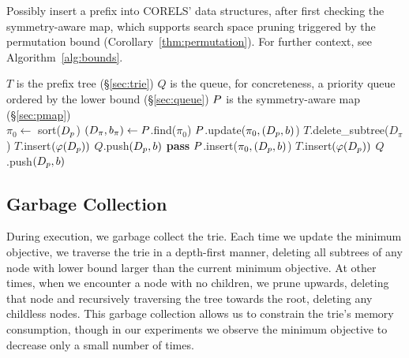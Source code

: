 \begin{algorithm}[t!]
  \caption{Possibly insert a prefix into CORELS' data structures, after first
  checking the symmetry-aware map, which supports search space pruning
  triggered by the permutation bound (Corollary~\ref{thm:permutation}).
  For further context, see Algorithm~\ref{alg:bounds}.}
\label{alg:pmap}
\begin{algorithmic}
\State $T$ is the prefix tree (\S\ref{sec:trie})
\State $Q$ is the queue, for concreteness, a priority queue ordered by the lower bound (\S\ref{sec:queue})
\State $P$ is the symmetry-aware map (\S\ref{sec:pmap}) \\

    \State $\pi_0 \gets$ sort($D_p$) 
    \State $(D_\pi, b_\pi) \gets P$.find($\pi_0$) 
         
            \State $P$.update($\pi_0, (D_p, b)$) 
            \State $T$.delete\_subtree($D_\pi$) 
            \State $T$.insert$(\varphi(D_p))$ 
            \State $Q$.push$(D_p, b)$ 
        \Else
            \State \textbf{pass} 
        \EndIf
    \Else
        \State $P$.insert($\pi_0, (D_p, b)$) 
        \State $T$.insert$(\varphi(D_p))$ 
        \State $Q$.push$(D_p, b)$ 
    \EndIf
\EndFunction
\end{algorithmic}
\end{algorithm}

\subsection{Garbage Collection}
\label{sec:gc}

During execution, we garbage collect the trie.
%
Each time we update the minimum objective,
we traverse the trie in a depth-first manner, deleting all subtrees
of any node with lower bound larger than the current minimum objective.
%
At other times, when we encounter a node with no children, we prune upwards,
deleting that node and recursively traversing the tree towards the root,
deleting any childless nodes.
%
This garbage collection allows us to constrain the trie's memory consumption, though in our
experiments we observe the minimum objective to decrease only a small number of times.

